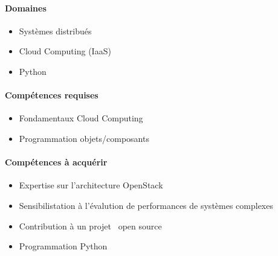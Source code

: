\documentclass[a4paper,11pt]{article}
\begin{document}
%

\begin{note}


\paragraph*{Domaines}

\begin{itemize}
 \item Systèmes distribués
 \item Cloud Computing (IaaS)
 \item Python
\end{itemize}

\paragraph*{Compétences requises}

\begin{itemize}
 \item Fondamentaux Cloud Computing
 \item Programmation objets/composants
\end{itemize}

\paragraph*{Compétences à acquérir}

\begin{itemize}
\item Expertise sur l'architecture OpenStack
\item Sensibilistation à l'évalution de performances de systèmes complexes
\item Contribution à un projet \og~open source~\fg
\item Programmation Python
\end{itemize}


\end{note}
\end{document}
